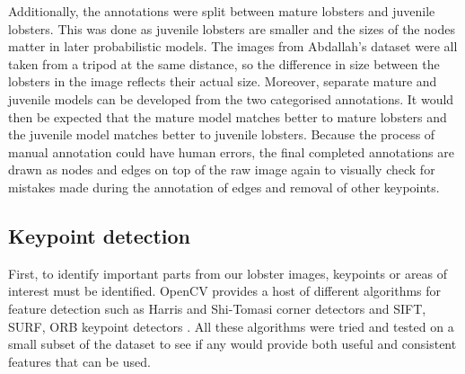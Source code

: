 \noindent
Additionally, the annotations were split between mature lobsters and juvenile lobsters. This was done as juvenile lobsters are smaller and the sizes of the nodes matter in later probabilistic models. The images from Abdallah's dataset were all taken from a tripod at the same distance, so the difference in size between the lobsters in the image reflects their actual size. Moreover, separate mature and juvenile models can be developed from the two categorised annotations. It would then be expected that the mature model matches better to mature lobsters and the juvenile model matches better to juvenile lobsters. 
\n
Because the process of manual annotation could have human errors, the final completed annotations are drawn as nodes and edges on top of the raw image again to visually check for mistakes made during the annotation of edges and removal of other keypoints.


\subsection{Keypoint detection}
First, to identify important parts from our lobster images, keypoints or areas of interest must be identified. OpenCV provides a host of different algorithms for feature detection such as Harris and Shi-Tomasi corner detectors and SIFT, SURF, ORB keypoint detectors \cite{opencv-tut1}. All these algorithms were tried and tested on a small subset of the dataset to see if any would provide both useful and consistent features that can be used. 

